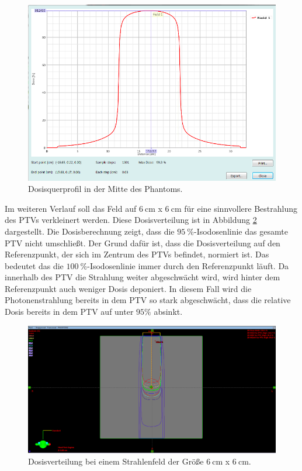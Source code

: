 \begin{figure}[H]
	\centering
	\includegraphics[width=0.7\linewidth]{../../Wasserphantom Bilder/Aufgabe213.png}
	\caption{Dosisquerprofil in der Mitte des Phantoms.}
	\label{fig:aufgabe2}
\end{figure}

Im weiteren Verlauf soll das Feld auf $\SI{6}{\centi\meter}$ x $\SI{6}{\centi\meter}$ für eine sinnvollere Bestrahlung des PTVs  verkleinert werden. Diese Dosisverteilung ist in
Abbildung \ref{fig:a2_4} dargestellt. Die Dosisberechnung zeigt, dass die $\SI{95}{\percent}$-Isodosenlinie das gesamte PTV nicht umschließt.
Der Grund dafür ist, dass die Dosisverteilung auf den Referenzpunkt, der sich im Zentrum des
PTVs befindet, normiert ist. Das bedeutet das die $\SI{100}{\percent}$-Isodosenlinie immer
durch den Referenzpunkt läuft. Da innerhalb des PTV die Strahlung weiter abgeschwächt
wird, wird hinter dem Referenzpunkt auch weniger Dosis deponiert. In diesem
Fall wird die Photonenstrahlung bereits in dem PTV so stark abgeschwächt, dass die
relative Dosis bereits in dem PTV auf unter $95\%$ absinkt.

 \begin{figure}[H]
 	\centering
 	\includegraphics[width=0.7\linewidth]{../../Wasserphantom Bilder/Aufgabe2.1_4.png}
 	\caption{Dosisverteilung bei einem Strahlenfeld der Größe $\SI{6}{\centi\meter}$ x $\SI{6}{\centi\meter}$.}
 	\label{fig:a2_4}
 \end{figure}


